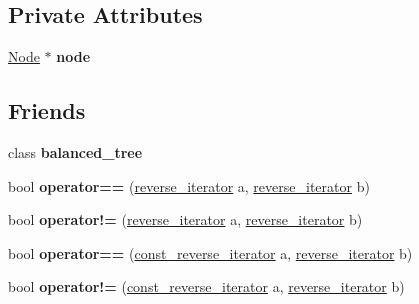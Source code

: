 \subsection*{Private Attributes}
\begin{DoxyCompactItemize}
\item 
\hypertarget{classbalanced__tree_1_1reverse__iterator_a5e330238c877e7edad80a81eba244817}{\hyperlink{structbalanced__tree_1_1Node}{Node} $\ast$ {\bfseries node}}\label{classbalanced__tree_1_1reverse__iterator_a5e330238c877e7edad80a81eba244817}

\end{DoxyCompactItemize}
\subsection*{Friends}
\begin{DoxyCompactItemize}
\item 
\hypertarget{classbalanced__tree_1_1reverse__iterator_a080cd3957bad1460e07534ae55222a40}{class {\bfseries balanced\+\_\+tree}}\label{classbalanced__tree_1_1reverse__iterator_a080cd3957bad1460e07534ae55222a40}

\item 
\hypertarget{classbalanced__tree_1_1reverse__iterator_a556561ae2a892c93adbff787a97b3e94}{bool {\bfseries operator==} (\hyperlink{classbalanced__tree_1_1reverse__iterator}{reverse\+\_\+iterator} a, \hyperlink{classbalanced__tree_1_1reverse__iterator}{reverse\+\_\+iterator} b)}\label{classbalanced__tree_1_1reverse__iterator_a556561ae2a892c93adbff787a97b3e94}

\item 
\hypertarget{classbalanced__tree_1_1reverse__iterator_a5731dc1823c2196d53243376faaf1803}{bool {\bfseries operator!=} (\hyperlink{classbalanced__tree_1_1reverse__iterator}{reverse\+\_\+iterator} a, \hyperlink{classbalanced__tree_1_1reverse__iterator}{reverse\+\_\+iterator} b)}\label{classbalanced__tree_1_1reverse__iterator_a5731dc1823c2196d53243376faaf1803}

\item 
\hypertarget{classbalanced__tree_1_1reverse__iterator_ac2e95486e6baf490cc72c5735b13fb7d}{bool {\bfseries operator==} (\hyperlink{classbalanced__tree_1_1const__reverse__iterator}{const\+\_\+reverse\+\_\+iterator} a, \hyperlink{classbalanced__tree_1_1reverse__iterator}{reverse\+\_\+iterator} b)}\label{classbalanced__tree_1_1reverse__iterator_ac2e95486e6baf490cc72c5735b13fb7d}

\item 
\hypertarget{classbalanced__tree_1_1reverse__iterator_af173b93cc8c693aef4a05027e0c763a4}{bool {\bfseries operator!=} (\hyperlink{classbalanced__tree_1_1const__reverse__iterator}{const\+\_\+reverse\+\_\+iterator} a, \hyperlink{classbalanced__tree_1_1reverse__iterator}{reverse\+\_\+iterator} b)}\label{classbalanced__tree_1_1reverse__iterator_af173b93cc8c693aef4a05027e0c763a4}


\end{DoxyCompactItemize}
